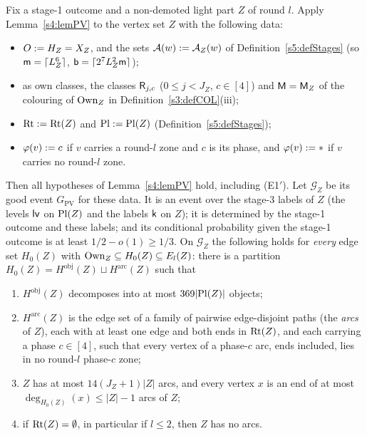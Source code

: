 \begin{lemma}\label{s5:lemChild}
Fix a stage-1 outcome and a non-demoted light part $Z$ of round $l$. Apply Lemma~\ref{s4:lemPV} to the vertex set $Z$ with the following data:
\begin{itemize}
\item $O\mathrel{:=} H_Z=X_Z$, and the sets $\mathcal{A}(w)\mathrel{:=}\mathcal{A}_Z(w)$ of Definition~\ref{s5:defStages} (so $\mathsf{m}=\lceil L_Z^6\rceil$, $\mathsf{b}=\lceil2^7L_Z^2\mathsf{m}\rceil$);
\item as own classes, the classes $\mathsf{R}_{j,c}$ ($0\le j<J_Z$, $c\in[4]$) and $\mathsf{M}=\mathsf{M}_Z$ of the colouring of $\mathrm{Own}_Z$ in Definition~\ref{s3:defCOL}(iii);
\item $\mathrm{Rt}\mathrel{:=}\mathrm{Rt}(Z)$ and $\mathrm{Pl}\mathrel{:=}\mathrm{Pl}(Z)$ (Definition~\ref{s5:defStages});
\item $\varphi(v)\mathrel{:=} c$ if $v$ carries a round-$l$ zone and $c$ is its phase, and $\varphi(v)\mathrel{:=} *$ if $v$ carries no round-$l$ zone.
\end{itemize}
Then all hypotheses of Lemma~\ref{s4:lemPV} hold, including \textup{(E1$'$)}. Let $\mathcal{G}_Z$ be its good event $G_{\mathrm{PV}}$ for these data. It is an event over the stage-3 labels of $Z$ (the levels $\mathsf{lv}$ on $\mathrm{Pl}(Z)$ and the labels $\mathsf{k}$ on $Z$); it is determined by the stage-1 outcome and these labels; and its conditional probability given the stage-1 outcome is at least $1/2-o(1)\ge1/3$. On $\mathcal{G}_Z$ the following holds for \emph{every} edge set $H_0(Z)$ with $\mathrm{Own}_Z\subseteq H_0(Z)\subseteq E_l(Z)$: there is a partition $H_0(Z)=H^{\mathrm{obj}}(Z)\sqcup H^{\mathrm{arc}}(Z)$ such that
\begin{enumerate}
\item[(a)] $H^{\mathrm{obj}}(Z)$ decomposes into at most $369|\mathrm{Pl}(Z)|$ objects;
\item[(b)] $H^{\mathrm{arc}}(Z)$ is the edge set of a family of pairwise edge-disjoint paths (the \emph{arcs} of $Z$), each with at least one edge and both ends in $\mathrm{Rt}(Z)$, and each carrying a phase $c\in[4]$, such that every vertex of a phase-$c$ arc, ends included, lies in no round-$l$ phase-$c$ zone;
\item[(c)] $Z$ has at most $14(J_Z+1)|Z|$ arcs, and every vertex $x$ is an end of at most $\deg_{H_0(Z)}(x)\le|Z|-1$ arcs of $Z$;
\item[(d)] if $\mathrm{Rt}(Z)=\emptyset$, in particular if $l\le2$, then $Z$ has no arcs.
\end{enumerate}
\deps{\ref{s4:lemPV}, \ref{s5:defStages}, \ref{s5:lemZones}, \ref{s3:lemCOL}, \ref{s2:propStructure}, \ref{s3:defCOL}, \ref{s1:condG3}}
\end{lemma}

